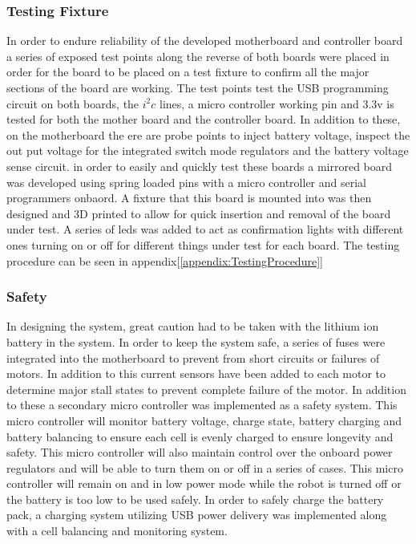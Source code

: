 \documentclass[conference]{IEEEtran}
\begin{document}
\subsubsection*{Testing Fixture}
In order to endure reliability of the developed motherboard and controller board a series of exposed test points along the reverse of both boards were placed in order for the board to be placed on a test fixture to confirm all the major sections of the board are working. The test points test the USB programming circuit on both boards, the $i^2c$ lines, a micro controller working pin and 3.3v is tested for both the mother board and the controller board. In addition to these, on the motherboard the ere are probe points to inject battery voltage, inspect the out put voltage for the integrated switch mode regulators and the battery voltage sense circuit. in order to easily and quickly test these boards a mirrored board was developed using spring loaded pins with a micro controller and serial programmers onbaord. A fixture that this board is mounted into was then designed and 3D printed to allow for quick insertion and removal of the board under test. A series of leds was added to act as confirmation lights with different ones turning on or off for different things under test for each board. The testing procedure can be seen in appendix[\ref{appendix:TestingProcedure}]

\subsubsection*{Safety}
    In designing the system, great caution had to be taken with the lithium ion battery in the system. In order to keep the system safe, a series of fuses were integrated into the motherboard to prevent from short circuits or failures of motors. In addition to this current sensors have been added to each motor to determine major stall states to prevent complete failure of the motor. In addition to these a secondary micro controller was implemented as a safety system. This micro controller will monitor battery voltage, charge state, battery charging and battery balancing to ensure each cell is evenly charged to ensure longevity and safety. This micro controller will also  maintain control over the onboard power regulators and will be able to turn them on or off in a series of cases. This micro controller will remain on and in low power mode while the robot is turned off or the battery is too low to be used safely. In order to safely charge the battery pack, a charging system utilizing USB power delivery was implemented along with a cell balancing and monitoring system. 
\end{document}
